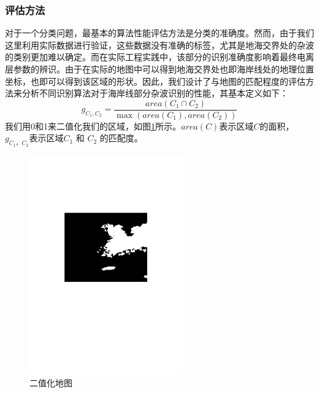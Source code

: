 \subsubsection{评估方法}
对于一个分类问题，最基本的算法性能评估方法是分类的准确度。然而，由于我们这里利用实际数据进行验证，这些数据没有准确的标签，尤其是地海交界处的杂波的类别更加难以确定。而在实际工程实践中，该部分的识别准确度影响着最终电离层参数的辨识。由于在实际的地图中可以得到地海交界处也即海岸线处的地理位置坐标，也即可以得到该区域的形状。因此，我们设计了与地图的匹配程度的评估方法来分析不同识别算法对于海岸线部分杂波识别的性能，其基本定义如下：
\begin{equation}
g_{C_1, C_2} = \frac{area({C_1\cap C_2})}{\max(area({C_1}), area({C_2}))}
\end{equation}
我们用0和1来二值化我们的区域，如图\ref{fig:binary}所示。$area(C)$表示区域$C$的面积， $g_{C_1， C_2}$表示区域$C_1$ 和 $C_2$ 的匹配度。
\begin{figure}[hbt]
	\centering
	\includegraphics[width=6.67cm]{figures/othr/binary}
	\caption{二值化地图}
	\label{fig:binary}
\end{figure}


